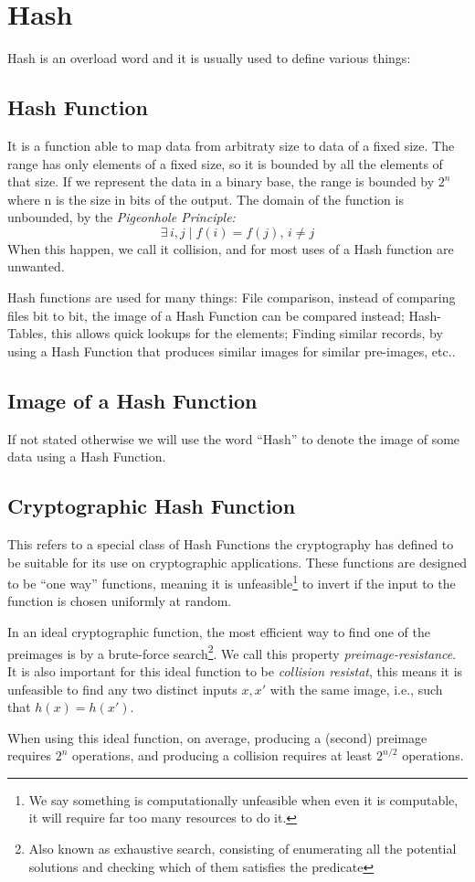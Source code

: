 \section{Hash}
Hash is an overload word and it is usually used to define various things:

\subsection{Hash Function}
It is a function able to map data from arbitraty size to data of a fixed size.
The range has only elements of a fixed size, so it is bounded by all the
  elements of that size.
If we represent the data in a binary base, the range is bounded by $2^n$ where n
  is the size in bits of the output.
The domain of the function is unbounded, by the \textit{Pigeonhole
  Principle:}
\begin{equation}
	\exists \, i, j \mid f(i) = f(j), \, i \neq j
\end{equation}
When this happen, we call it collision, and for most uses of a Hash function are
  unwanted.

Hash functions are used for many things: File comparison, instead of comparing
  files bit to bit, the image of a Hash Function can be compared instead;
  Hash-Tables, this allows quick lookups for the elements; Finding similar
  records, by using a Hash Function that produces similar images for similar
  pre-images, etc..

\subsection{Image of a Hash Function}

If not stated otherwise we will use the word ``Hash'' to denote the image of
  some data using a Hash Function.

\subsection{Cryptographic Hash Function}
This refers to a special class of Hash Functions the cryptography has defined
  to be suitable for its use on cryptographic applications. These functions are
  designed to be ``one way'' functions, meaning it is unfeasible\footnote{We %
  say something is computationally unfeasible when even it is computable, it
  will require far too many resources to do it.} to invert if the input to the
  function is chosen uniformly at random.

In an ideal cryptographic function, the most efficient way to find one of the
  preimages is by a brute-force search\footnote{Also known as exhaustive search,
  consisting of enumerating all the potential solutions and checking which of
  them satisfies the predicate}. We call this property
  \textit{preimage-resistance}.
It is also important for this ideal function to be \textit{collision
  resistat}, this means it is unfeasible to find any two distinct inputs
  $x, x'$ with the same image, i.e., such that $h(x) = h(x')$.

When using this ideal function, on average, producing a (second) preimage
  requires $2^n$ operations, and producing a collision requires at least
  $2^{n / 2} $ operations\cite{preneel1993analysis}.
